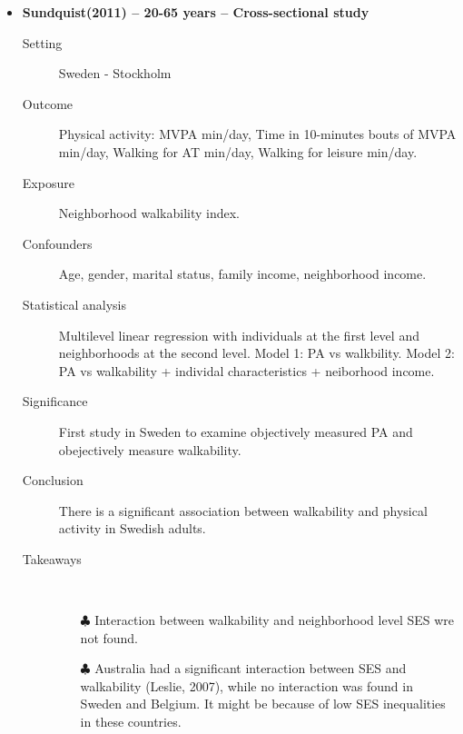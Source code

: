 \documentclass{article}
\begin{document}
\begin{itemize}
\item{\bf Sundquist(2011) -- 20-65 years  -- Cross-sectional study}
		\begin{description}
			\item[Setting] Sweden - Stockholm 
			\item[Outcome] Physical activity: MVPA min/day, Time in 10-minutes bouts of MVPA min/day, Walking for AT min/day, Walking for leisure min/day. 
			\item[Exposure] Neighborhood walkability index.  
			\item[Confounders] Age, gender, marital status, family income, neighborhood income. 
			\item[Statistical analysis] Multilevel linear regression with individuals at the first level and neighborhoods at the second level. Model 1: PA vs walkbility. Model 2: PA vs walkability + individal characteristics + neiborhood income. 
			\item[Significance] First study in Sweden to examine objectively measured PA and obejectively measure walkability.  
			\item[Conclusion] There is a significant association between walkability and physical activity in Swedish adults. 
			\item[Takeaways] \mbox{}\\
				\begin{itemize}
					\item[$\clubsuit$] Interaction between walkability and neighborhood level SES wre not found.
					\item[$\clubsuit$] Australia had a significant interaction between SES and walkability (Leslie, 2007), while no interaction was found in Sweden and Belgium. It might be because of low SES inequalities in these countries.  
				\end{itemize} 
			
		\end{description}



\end{itemize}
\end{document}
